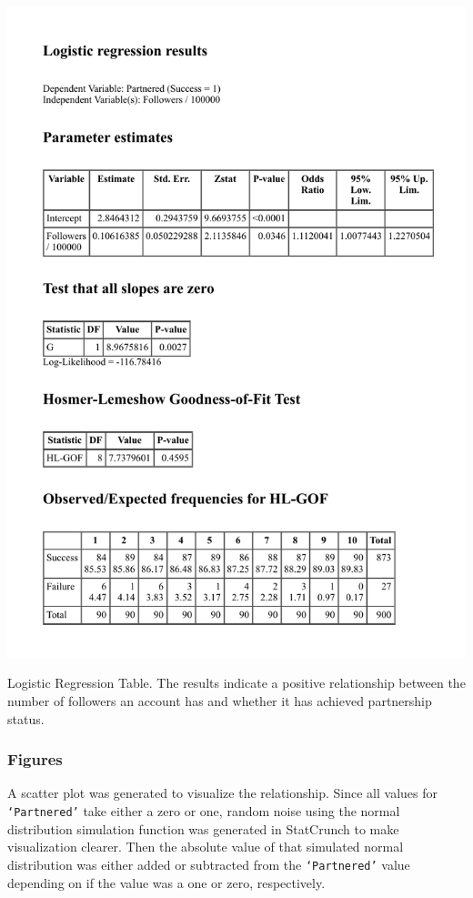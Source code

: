 \documentclass[12pt]{article}
\begin{document}
\begin{table}[H]
  \centering %
  \includegraphics[scale=0.9]{../StatCrunch_Results/logit_partnered_followers/table}
  \captionsetup{justification=centering, singlelinecheck=false, margin=2cm}
  \caption[Logistic Regression: Predict Partnered Status by Number of Followers]{Logistic Regression Table. The results indicate a positive relationship between the number of followers an account has and whether it has achieved partnership status.}
  \label{tab:logistic_table}
\end{table}

\subsubsection{Figures}

A scatter plot was generated to visualize the relationship. Since all values for \texttt{`Partnered'} take either a zero or one, random noise using the normal distribution simulation function was generated in StatCrunch to make visualization clearer. Then the absolute value of that simulated normal distribution was either added or subtracted from the \texttt{`Partnered'} value depending on if the value was a one or zero, respectively. 
\end{document}

